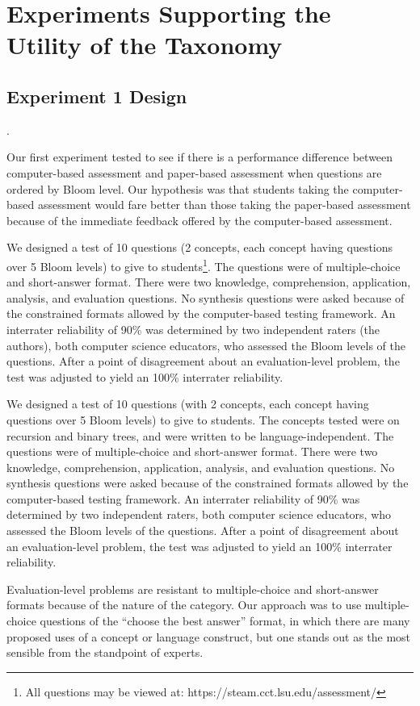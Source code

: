 \section{Experiments Supporting the Utility of the Taxonomy}

\subsection{Experiment 1 Design}. 

Our first experiment tested to see if there is a performance difference between
computer-based assessment and paper-based assessment when questions are ordered
by Bloom level.  Our hypothesis was that students taking the computer-based
assessment would fare better than those taking the paper-based assessment
because of the immediate feedback offered by the computer-based assessment.

We designed a test of 10 questions (2 concepts, each concept having questions
over 5 Bloom levels) to give to students\footnote{All questions may be viewed
at: https://steam.cct.lsu.edu/assessment/}. The questions were of
multiple-choice and short-answer format.  There were two knowledge,
comprehension, application, analysis, and evaluation questions.  No synthesis
questions were asked because of the constrained formats allowed by the
computer-based testing framework.  An interrater reliability of 90\% was
determined by two independent raters (the authors), both computer science
educators, who assessed the Bloom levels of the questions.  After a point of
disagreement about an evaluation-level problem, the test was adjusted to yield
an 100\% interrater reliability.

We designed a test of 10 questions (with 2 concepts, each concept having
questions over 5 Bloom levels) to give to students. The concepts tested were on
recursion and binary trees, and were written to be language-independent.  The
questions were of multiple-choice and short-answer format.  There were two
knowledge, comprehension, application, analysis, and evaluation questions.  No
synthesis questions were asked because of the constrained formats allowed by
the computer-based testing framework.  An interrater reliability of 90\% was
determined by two independent raters, both computer science educators, who
assessed the Bloom levels of the questions.  After a point of disagreement
about an evaluation-level problem, the test was adjusted to yield an 100\%
interrater reliability.

Evaluation-level problems are resistant to multiple-choice and short-answer
formats because of the nature of the category.  Our approach was to use
multiple-choice questions of the ``choose the best answer'' format, in which
there are many proposed uses of a concept or language construct, but one stands
out as the most sensible from the standpoint of experts. 

